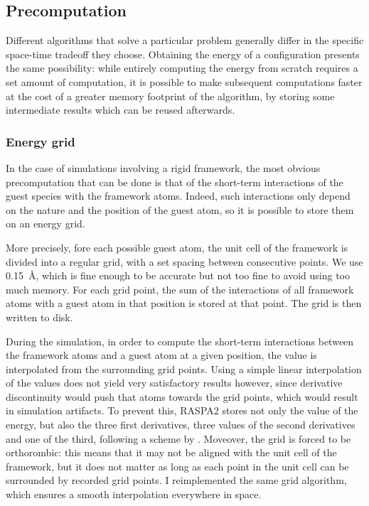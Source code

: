 \documentclass[main.tex]{subfiles}
\begin{document}
\subsection{Precomputation}

\label{precomputations}

Different algorithms that solve a particular problem generally differ in the specific space-time tradeoff they choose. Obtaining the energy of a configuration presents the same possibility: while entirely computing the energy from scratch requires a set amount of computation, it is possible to make subsequent computations faster at the cost of a greater memory footprint of the algorithm, by storing some intermediate results which can be reused afterwards.

\subsubsection{Energy grid}

\label{energygrid}

In the case of simulations involving a rigid framework, the most obvious precomputation that can be done is that of the short-term interactions of the guest species with the framework atoms. Indeed, such interactions only depend on the nature and the position of the guest atom, so it is possible to store them on an energy grid.

More precisely, fore each possible guest atom, the unit cell of the framework is divided into a regular grid, with a set spacing between consecutive points. We use \qty{0.15}{\angstrom}, which is fine enough to be accurate but not too fine to avoid using too much memory. For each grid point, the sum of the interactions of all framework atoms with a guest atom in that position is stored at that point. The grid is then written to disk.

During the simulation, in order to compute the short-term interactions between the framework atoms and a guest atom at a given position, the value is interpolated from the surrounding grid points. Using a simple linear interpolation of the values does not yield very satisfactory results however, since derivative discontinuity would push that atoms towards the grid points, which would result in simulation artifacts. To prevent this, RASPA2 stores not only the value of the energy, but also the three first derivatives, three values of the second derivatives and one of the third, following a scheme by \textcite{TricubicGridInterpolaction}. Moveover, the grid is forced to be orthorombic: this means that it may not be aligned with the unit cell of the framework, but it does not matter as long as each point in the unit cell can be surrounded by recorded grid points. I reimplemented the same grid algorithm, which ensures a smooth interpolation everywhere in space.
\end{document}
